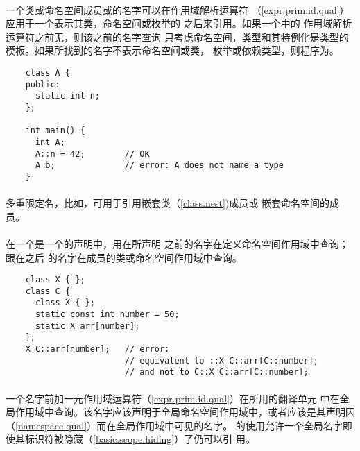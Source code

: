 \paragraph{} %
一个类或命名空间成员或\enumr{}的名字可以在\tm{::}作用域解析运算符
（\ref{expr.prim.id.qual}）应用于一个表示其类，命名空间或枚举的
之后来引用。如果一个中的
\tm{::}作用域解析运算符之前无，则该\tm{::}之前的名字查询
只考虑命名空间，类型和其特例化是类型的模板。如果所找到的名字不表示命名空间或类，
枚举或依赖类型，则程序为\illform{}。

\begin{example}
  \begin{lstlisting}
    class A {
    public:
      static int n;
    };

    int main() {
      int A;
      A::n = 42;        // OK
      A b;              // error: A does not name a type
    }
  \end{lstlisting}
\end{example}

\paragraph{} %
\begin{note}
  多重限定名，比如，可用于引用嵌套类（\ref{class.nest})成员或
  嵌套命名空间的成员。
\end{note}

\paragraph{} %
在一个是一个的声明中，用在所声明
之前的名字在定义命名空间作用域中查询；跟在之后
的名字在成员的类或命名空间作用域中查询。

\begin{example}
  \begin{lstlisting}
    class X { };
    class C {
      class X { };
      static const int number = 50;
      static X arr[number];
    };
    X C::arr[number];   // error:
                        // equivalent to ::X C::arr[C::number];
                        // and not to C::X C::arr[C::number];
  \end{lstlisting}
\end{example}

\paragraph{} %
一个名字前加一元作用域运算符\tm{::}（\ref{expr.prim.id.qual}）在所用的翻译单元
中在全局作用域中查询。该名字应该声明于全局命名空间作用域中，或者应该是其声明因
（\ref{namespace.qual}）而在全局作用域中可见的名字。\tm{::}
的使用允许一个全局名字即使其标识符被隐藏（\ref{basic.scope.hiding}）了仍可以引
用。

